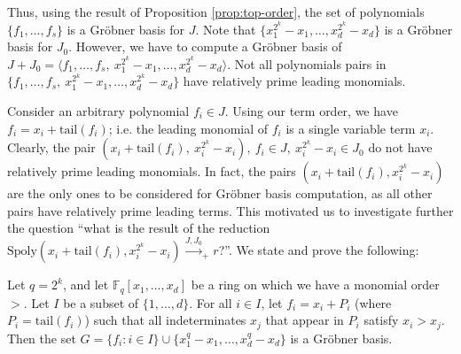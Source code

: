 Thus, using the result of Proposition \ref{prop:top-order}, the set
of polynomials $\{f_1, \dots, f_s\}$ is a Gr\"obner basis for
$J$. Note that  $\{x_1^{2^k} - x_1, \dots, x_d^{2^k}
- x_d\}$ is a Gr\"obner basis for $J_0$. However, we have to compute a
Gr\"obner basis of $J + J_0 = \langle f_1, \dots, f_s, ~x_1^{2^k} - x_1,
\dots, x_d^{2^k} - x_d \rangle$.  Not all polynomials pairs in $\{f_1,
\dots, f_s, ~x_1^{2^k} - x_1, \dots, x_d^{2^k} - x_d\}$ have
relatively prime leading monomials.  

Consider an arbitrary polynomial $f_i \in J$. Using our term order, we
have $f_i = x_i + \text{tail}(f_i)$; i.e. the leading monomial of
$f_i$ is a single variable term $x_i$. Clearly, the pair
$(x_i+\text{tail}(f_i), ~x_i^{2^k}-x_i), ~f_i \in J, ~x_i^{2^k} - x_i \in J_0$
do not have relatively prime leading monomials. In fact, the pairs
$(x_i+\text{tail}(f_i), x_i^{2^k}-x_i)$ are the only ones to be considered
for Gr\"obner basis computation, as all other pairs have relatively
prime leading terms. This motivated us to investigate further the
question ``what is the result of the reduction
$\text{Spoly}(x_i+\text{tail}(f_i), x_i^{2^k}-x_i) 
\stackrel{J,J_0}{\longrightarrow}_+ r $?''. We state and prove the
following: 

\begin{Theorem}
\label{thm:contrib}
Let $q = 2^k$, and let $\mathbb{F}_q[x_1, \ldots, x_d]$ be a ring on
which we have a monomial order $>$. Let $I$ be a subset of $\{1,
\ldots, d\}$. For all $i \in I$, let $f_i = x_i +P_i$ (where $P_i =
\text{tail}(f_i)$) such that  all indeterminates $x_j$  that appear in
$P_i$ satisfy $x_i > x_j$.  Then the set $G = \{f_i :  i  \in I\} \cup
\{x_1^q-x_1, \ldots, x_d^q-x_d\}$ is a Gr\"obner basis.  
\end{Theorem}

